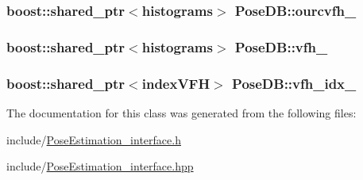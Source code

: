 \hypertarget{classPoseDB_a1a7c85d9cb1c33e27abe73f7d61aef6d}{
\subsubsection[{ourcvfh\-\_\-}]{\setlength{\rightskip}{0pt plus 5cm}boost\-::shared\-\_\-ptr$<${\bf histograms}$>$ Pose\-D\-B\-::ourcvfh\-\_\-\hspace{0.3cm}{\ttfamily [private]}}}\label{classPoseDB_a1a7c85d9cb1c33e27abe73f7d61aef6d}
\hypertarget{classPoseDB_ab0d34fd8b0fc5f74e2b7fc5261fdab8e}{
\subsubsection[{vfh\-\_\-}]{\setlength{\rightskip}{0pt plus 5cm}boost\-::shared\-\_\-ptr$<${\bf histograms}$>$ Pose\-D\-B\-::vfh\-\_\-\hspace{0.3cm}{\ttfamily [private]}}}\label{classPoseDB_ab0d34fd8b0fc5f74e2b7fc5261fdab8e}
\hypertarget{classPoseDB_a166e65f9bf6e0e268ae8e082e43fc242}{
\subsubsection[{vfh\-\_\-idx\-\_\-}]{\setlength{\rightskip}{0pt plus 5cm}boost\-::shared\-\_\-ptr$<${\bf index\-V\-F\-H}$>$ Pose\-D\-B\-::vfh\-\_\-idx\-\_\-\hspace{0.3cm}{\ttfamily [private]}}}\label{classPoseDB_a166e65f9bf6e0e268ae8e082e43fc242}


The documentation for this class was generated from the following files\-:\begin{DoxyCompactItemize}
\item 
include/\hyperlink{PoseEstimation__interface_8h}{Pose\-Estimation\-\_\-interface.\-h}\item 
include/\hyperlink{PoseEstimation__interface_8hpp}{Pose\-Estimation\-\_\-interface.\-hpp}\end{DoxyCompactItemize}
